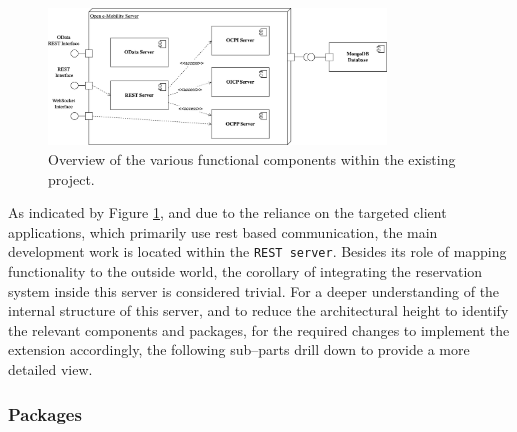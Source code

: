 \begin{figure}[h]
    \centering
    \includegraphics[width=0.8\textwidth,keepaspectratio]{resources/images/main/6_implementation/DeploymentView.png}
    \caption{Overview of the various functional components within the existing project.}
    \label{fig:module-view}
\end{figure}

\noindent As indicated by Figure \ref{fig:module-view}, and due to the reliance on the targeted client applications, which primarily use \acrshort{rest} based communication, the main development work is located within the \texttt{REST server}. 
Besides its role of mapping functionality to the outside world, the corollary of integrating the reservation system inside this server is considered trivial.
For a deeper understanding of the internal structure of this server, and to reduce the architectural height to identify the relevant components and packages, for the required changes to implement the extension accordingly, the following sub--parts drill down to provide a more detailed view.

\subsubsection{Packages}
\label{ch:Implementation:sec:Reservation System:ssec:Architectural Views:sssec:Packages}

